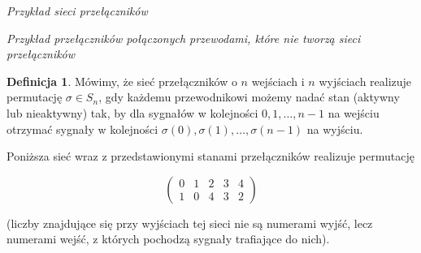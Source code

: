 \documentclass[a4paper]{article}
\theoremstyle{definition}
\newtheorem{df}[tw]{Definicja}
\begin{document}
\begin{minipage}{.5\textwidth}
\begin{center}
\end{center} 
\end{minipage}

\begin{minipage}{.5\textwidth}
    \begin{center}
        {\it Przykład sieci przełączników}
    \end{center}
\end{minipage}
\begin{minipage}{.5\textwidth}
    \begin{center}
        {\it Przykład przełączników połączonych przewodami, które nie tworzą sieci przełączników}
    \end{center}
\end{minipage}




\begin{df}
    Mówimy, że sieć przełączników o \(n\) wejściach i \(n\) wyjściach realizuje permutację \(\sigma \in S_n\), gdy każdemu przewodnikowi możemy nadać stan (aktywny lub nieaktywny) tak, by dla sygnałów w kolejności \(0, 1, \ldots, n-1\) na wejściu otrzymać sygnały w kolejności \(\sigma (0), \sigma (1), \ldots, \sigma (n-1)\) na wyjściu. 
\end{df}

Poniższa sieć wraz z przedstawionymi stanami przełączników realizuje permutację

\[
    \begin{pmatrix}
        0 & 1 & 2 & 3 & 4  \\
        1 & 0 & 4 & 3 & 2 
    \end{pmatrix} 
\]

(liczby znajdujące się przy wyjściach tej sieci nie są numerami wyjść, lecz numerami wejść, z których pochodzą sygnały trafiające do nich).
\end{document}
